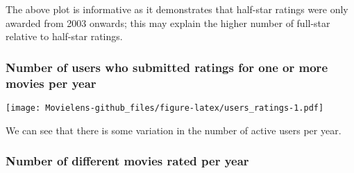 \documentclass[]{article}
\newenvironment{Shaded}{\begin{snugshade}}{\end{snugshade}}
\newcommand{\DataTypeTok}[1]{\textcolor[rgb]{0.13,0.29,0.53}{#1}}
\newcommand{\DecValTok}[1]{\textcolor[rgb]{0.00,0.00,0.81}{#1}}
\newcommand{\KeywordTok}[1]{\textcolor[rgb]{0.13,0.29,0.53}{\textbf{#1}}}
\newcommand{\NormalTok}[1]{#1}
\newcommand{\OperatorTok}[1]{\textcolor[rgb]{0.81,0.36,0.00}{\textbf{#1}}}
\newcommand{\StringTok}[1]{\textcolor[rgb]{0.31,0.60,0.02}{#1}}
\begin{document}
The above plot is informative as it demonstrates that half-star ratings
were only awarded from 2003 onwards; this may explain the higher number
of full-star relative to half-star ratings.

\hypertarget{number-of-users-who-submitted-ratings-for-one-or-more-movies-per-year}{%
\subsubsection{Number of users who submitted ratings for one or more
movies per
year}\label{number-of-users-who-submitted-ratings-for-one-or-more-movies-per-year}}

\begin{Shaded}
\end{Shaded}

\texttt{[image: Movielens-github\_files/figure-latex/users\_ratings-1.pdf]}

We can see that there is some variation in the number of active users
per year.

\hypertarget{number-of-different-movies-rated-per-year}{%
\subsubsection{Number of different movies rated per
year}\label{number-of-different-movies-rated-per-year}}

\begin{Shaded}
\end{Shaded}
\end{document}
